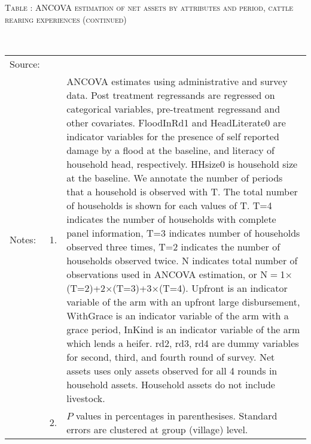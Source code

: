 \addtocounter{table}{-1}
\vspace{-1cm}\hspace{-1cm}\begin{minipage}[t]{14cm}
\hfil\textsc{\normalsize Table \thetable: ANCOVA estimation of net assets by attributes and period, cattle rearing experiences (continued)\label{tab ANCOVA narrow net assets Experience timevarying attributes 2}}\\
\setlength{\tabcolsep}{1pt}
\setlength{\baselineskip}{8pt}
\renewcommand{\arraystretch}{.52}
\hfil{}\\
\renewcommand{\arraystretch}{.8}
\setlength{\tabcolsep}{1pt}
\begin{tabular}{>{\hfill\scriptsize}p{1cm}<{}>{\hfill\scriptsize}p{.25cm}<{}>{\scriptsize}p{12cm}<{\hfill}}
Source:& \multicolumn{2}{l}{\scriptsize Estimated with GUK administrative and survey data.}\\
Notes: & 1. & ANCOVA estimates using administrative and survey data. Post treatment regressands are regressed on categorical variables, pre-treatment regressand and other covariates. \textsf{FloodInRd1} and \textsf{HeadLiterate0} are indicator variables for the presence of self reported damage by a flood at the baseline, and literacy of household head, respectively. \textsf{HHsize0} is household size at the baseline. We annotate the number of periods that a household is observed with \textsf{T}. The total number of households is shown for each values of \textsf{T}. \textsf{T=4} indicates the number of households with complete panel information, \textsf{T=3} indicates number of households observed three times, \textsf{T=2} indicates the number of households observed twice. \textsf{N} indicates total number of observations used in ANCOVA estimation, or \textsf{N$=$1$\times$(T=2)+2$\times$(T=3)+3$\times$(T=4)}.  \textsf{Upfront} is an indicator variable of the arm with an upfront large disbursement, \textsf{WithGrace} is an indicator variable of the arm with a grace period, \textsf{InKind} is an indicator variable of the arm which lends a heifer. \textsf{rd2, rd3, rd4} are dummy variables for second, third, and fourth round of survey. Net assets uses only assets observed for all 4 rounds in household assets. Household assets do not include livestock. \\
& 2. & $P$ values in percentages in parenthesises. Standard errors are clustered at group (village) level.
\end{tabular}
\end{minipage}


